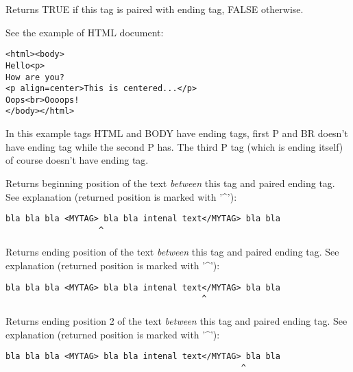 \label{wxhtmltaghasending}


Returns TRUE if this tag is paired with ending tag, FALSE otherwise.

See the example of HTML document:

\begin{verbatim}
<html><body>
Hello<p>
How are you?
<p align=center>This is centered...</p>
Oops<br>Oooops!
</body></html>
\end{verbatim}

In this example tags HTML and BODY have ending tags, first P and BR 
doesn't have ending tag while the second P has. The third P tag (which
is ending itself) of course doesn't have ending tag.

\label{wxhtmltaggetbeginpos}


Returns beginning position of the text {\it between} this tag and paired
ending tag. 
See explanation (returned position is marked with '^'):

\begin{verbatim}
bla bla bla <MYTAG> bla bla intenal text</MYTAG> bla bla
                   ^
\end{verbatim}

\label{wxhtmltaggetendpos1}


Returns ending position of the text {\it between} this tag and paired
ending tag.
See explanation (returned position is marked with '^'):

\begin{verbatim}
bla bla bla <MYTAG> bla bla intenal text</MYTAG> bla bla
                                        ^
\end{verbatim}


\label{wxhtmltaggetendpos2}


Returns ending position 2 of the text {\it between} this tag and paired
ending tag.
See explanation (returned position is marked with '^'):

\begin{verbatim}
bla bla bla <MYTAG> bla bla intenal text</MYTAG> bla bla
                                                ^
\end{verbatim}

